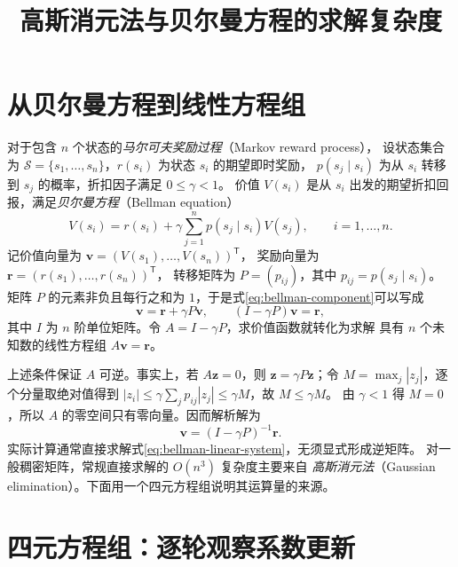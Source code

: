 \documentclass[UTF8,12pt,a4paper,fontset=fandol]{ctexart}
\title{高斯消元法与贝尔曼方程的求解复杂度}
\author{}
\date{}
\begin{document}
\maketitle

\section{从贝尔曼方程到线性方程组}

对于包含 $n$ 个状态的\emph{马尔可夫奖励过程}（Markov reward process），
设状态集合为 $\mathcal S=\{s_1,\ldots,s_n\}$，$r(s_i)$ 为状态 $s_i$ 的期望即时奖励，
$p(s_j\mid s_i)$ 为从 $s_i$ 转移到 $s_j$ 的概率，折扣因子满足 $0\leq\gamma<1$。
价值 $V(s_i)$ 是从 $s_i$ 出发的期望折扣回报，满足\emph{贝尔曼方程}（Bellman equation）
\begin{equation}
  V(s_i)=r(s_i)+\gamma\sum_{j=1}^{n}p(s_j\mid s_i)V(s_j),
  \qquad i=1,\ldots,n.
  \label{eq:bellman-component}
\end{equation}
记价值向量为 $\boldsymbol v=(V(s_1),\ldots,V(s_n))^{\mathsf T}$，
奖励向量为 $\boldsymbol r=(r(s_1),\ldots,r(s_n))^{\mathsf T}$，
转移矩阵为 $P=(p_{ij})$，其中 $p_{ij}=p(s_j\mid s_i)$。
矩阵 $P$ 的元素非负且每行之和为 $1$，于是式\eqref{eq:bellman-component}可以写成
\begin{equation}
  \boldsymbol v=\boldsymbol r+\gamma P\boldsymbol v,
  \qquad (I-\gamma P)\boldsymbol v=\boldsymbol r,
  \label{eq:bellman-linear-system}
\end{equation}
其中 $I$ 为 $n$ 阶单位矩阵。令 $A=I-\gamma P$，求价值函数就转化为求解
具有 $n$ 个未知数的线性方程组 $A\boldsymbol v=\boldsymbol r$。

上述条件保证 $A$ 可逆。事实上，若 $A\boldsymbol z=0$，则
$\boldsymbol z=\gamma P\boldsymbol z$；令 $M=\max_j|z_j|$，逐个分量取绝对值得到
$|z_i|\leq\gamma\sum_jp_{ij}|z_j|\leq\gamma M$，故 $M\leq\gamma M$。
由 $\gamma<1$ 得 $M=0$，所以 $A$ 的零空间只有零向量。因而解析解为
\begin{equation}
  \boldsymbol v=(I-\gamma P)^{-1}\boldsymbol r.
  \label{eq:bellman-inverse}
\end{equation}
实际计算通常直接求解式\eqref{eq:bellman-linear-system}，无须显式形成逆矩阵。
对一般稠密矩阵，常规直接求解的 $O(n^3)$ 复杂度主要来自
\emph{高斯消元法}（Gaussian elimination）。下面用一个四元方程组说明其运算量的来源。

\section{四元方程组：逐轮观察系数更新}
\end{document}
